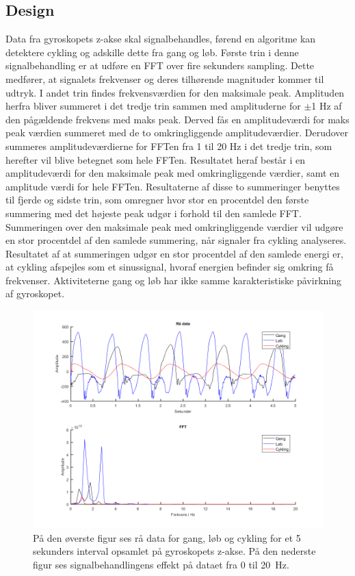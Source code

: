 \subsection{Design}\label{design_cykling}
Data fra gyroskopets z-akse skal signalbehandles, førend en algoritme kan detektere cykling og adskille dette fra gang og løb. Første trin i denne signalbehandling er at udføre en FFT over fire sekunders sampling. Dette medfører, at signalets frekvenser og deres tilhørende magnituder kommer til udtryk. I andet trin findes frekvensværdien for den maksimale peak. Amplituden herfra bliver summeret i det tredje trin sammen med amplituderne for $\pm$1 Hz af den pågældende frekvens med maks peak. Derved fås en amplitudeværdi for maks peak værdien summeret med de to omkringliggende amplitudeværdier. Derudover summeres amplitudeværdierne for FFTen fra 1 til 20 Hz i det tredje trin, som herefter vil blive betegnet som hele FFTen. Resultatet heraf består i en amplitudeværdi for den maksimale peak med omkringliggende værdier, samt en amplitude værdi for hele FFTen. Resultaterne af disse to summeringer benyttes til fjerde og sidste trin, som omregner hvor stor en procentdel den første summering med det højeste peak udgør i forhold til den samlede FFT. Summeringen over den maksimale peak med omkringliggende værdier vil udgøre en stor procentdel af den samlede summering, når signaler fra cykling analyseres. Resultatet af at summeringen udgør en stor procentdel af den samlede energi er, at cykling afspejles som et sinussignal, hvoraf energien befinder sig omkring få frekvenser. Aktiviteterne gang og løb har ikke samme karakteristiske påvirkning af gyroskopet.
\begin{figure}[H]
	\centering
	\includegraphics[scale=0.8]{figures/cDesign/gyro_behandling.png}
	\caption{På den øverste figur ses rå data for gang, løb og cykling for et 5 sekunders interval opsamlet på gyroskopets z-akse. På den nederste figur ses signalbehandlingens effekt på dataet fra 0 til 20~Hz.}
	\label{fig:gyro_behandling}
\end{figure}\vspace{-0.5cm}

